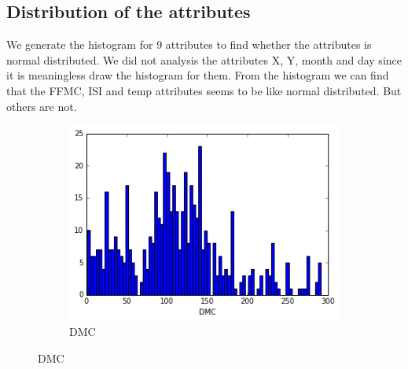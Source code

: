 \subsection{Distribution of the attributes}
We generate the histogram for 9 attributes to find whether the attributes is normal distributed. We did not analysis the attributes X, Y, month and day since it is meaningless draw the histogram for them. From the histogram we can find that the FFMC, ISI and temp attributes seems to be like normal distributed. But others are not. 

\begin{figure}[!ht]
\centering
\begin{subfigure}[b]{.45\linewidth}
\includegraphics[width=\linewidth]{fig/hist/DMC.png}
\caption{DMC}\label{fig:mouse}
\end{subfigure}


\end{figure}
